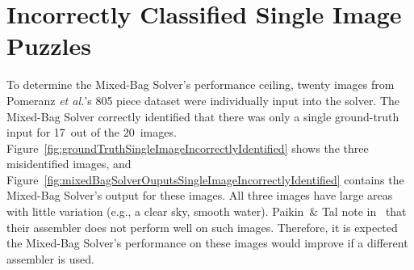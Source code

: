 \chapter{Incorrectly Classified Single Image Puzzles}\label{chap:incorreclyClassifiedSingleImages}

To determine the Mixed-Bag Solver's performance ceiling, twenty images from Pomeranz \textit{et al.}'s 805 piece dataset were individually input into the solver.  The Mixed-Bag Solver correctly identified that there was only a single ground-truth input for 17~out of the 20~images.  Figure~\ref{fig:groundTruthSingleImageIncorrectlyIdentified} shows the three misidentified images, and Figure~\ref{fig:mixedBagSolverOuputsSingleImageIncorrectlyIdentified} contains the Mixed-Bag Solver's output for these images.  All three images have large areas with little variation (e.g., a clear sky, smooth water).  Paikin~\& Tal note in~\cite{paikin2015} that their assembler does not perform well on such images.  Therefore, it is expected the Mixed-Bag Solver's performance on these images would improve if a different assembler is used.

